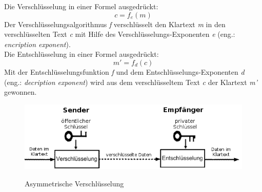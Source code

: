 Die Verschlüsselung in einer Formel ausgedrückt:
\begin{equation*}
  c = f_e (m)
  \label{eqn:asy_versch}
\end{equation*}
Der Verschlüsselungsalgorithmus \textit{f} verschlüsselt den Klartext \textit{m} in den verschlüsselten Text \textit{c} mit Hilfe des Verschlüsselungs-Exponenten \textit{e} (eng.: \textit{encription exponent}).\\
Die Entschlüsselung in einer Formel ausgedrückt:
\begin{equation*}
  m' = f_d (c) 
  \label{eqn:asy_entsch}
\end{equation*}
Mit der Entschlüsselungsfunktion \textit{f} und dem Entschlüsselungs-Exponenten \textit{d} (eng.: \textit{decription exponent}) wird aus dem verschlüsseltem Text \textit{c} der Klartext \textit{m'} gewonnen.
%
%
\begin{figure}[ht]
\begin{center}
\label{fig:assymetrisch}
\includegraphics[width=15cm]{images/asymmetrischeVerschluesselung.png}
\caption[Asymmetrische Verschlüsselung Quelle:\newline eigene]{Asymmetrische Verschlüsselung}
\end{center}
\end{figure}
